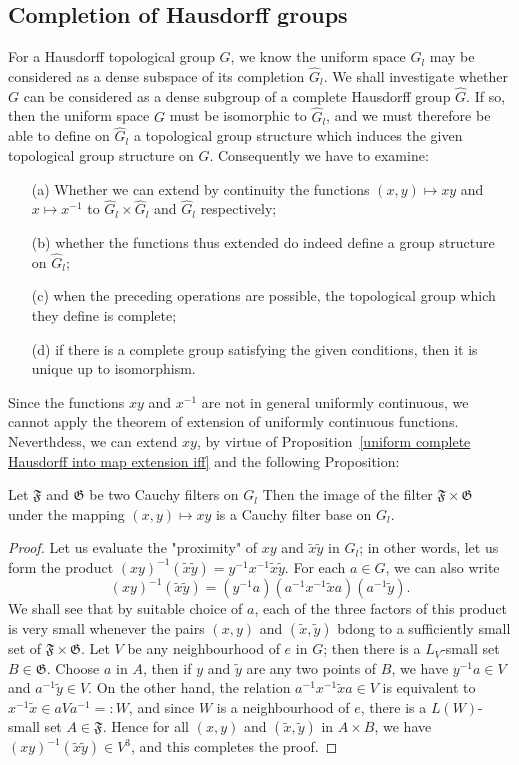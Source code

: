 \subsection{Completion of Hausdorff groups}
For a Hausdorff topological group $G$, we know the uniform space $G_l$ may be considered as a dense subspace of its completion $\widehat{G}_l$. We shall investigate whether $G$ can be considered as a dense subgroup of a complete Hausdorff group $\widehat{G}$. If so, then the uniform space $G$ must be isomorphic to $\widehat{G}_l$, and we must therefore be able to define on $\widehat{G}_l$ a topological group structure which induces the given topological group structure on $G$. Consequently we have to examine:
\begin{itemize}
\item[(a)] Whether we can extend by continuity the functions $(x,y)\mapsto xy$ and $x\mapsto x^{-1}$ to $\widehat{G}_l\times\widehat{G}_l$ and $\widehat{G}_l$ respectively;
\item[(b)] whether the functions thus extended do indeed define a group structure on $\widehat{G}_l$;
\item[(c)] when the preceding operations are possible, the topological group which they define is complete;
\item[(d)] if there is a complete group satisfying the given conditions, then it is unique up to isomorphism.
\end{itemize}
Since the functions $xy$ and $x^{-1}$ are not in general uniformly continuous, we cannot apply the theorem of extension of uniformly continuous functions. Neverthdess, we can extend $xy$, by virtue of Proposition~\ref{uniform complete Hausdorff into map extension iff} and the following Proposition:
\begin{proposition}\label{topological group Cauchy filter under multiplication}
Let $\mathfrak{F}$ and $\mathfrak{G}$ be two Cauchy filters on $G_l$ Then the image of the filter $\mathfrak{F}\times\mathfrak{G}$ under the mapping $(x,y)\mapsto xy$ is a Cauchy filter base on $G_l$.
\end{proposition}
\begin{proof}
Let us evaluate the "proximity" of $xy$ and $\tilde{x}\tilde{y}$ in $G_l$; in other words, let us form the product $(xy)^{-1}(\tilde{x}\tilde{y})=y^{-1}x^{-1}\tilde{x}\tilde{y}$. For each $a\in G$, we can also write
\[(xy)^{-1}(\tilde{x}\tilde{y})=(y^{-1}a)(a^{-1}x^{-1}\tilde{x}a)(a^{-1}\tilde{y}).\]
We shall see that by suitable choice of $a$, each of the three factors of this product is very small whenever the pairs $(x,y)$ and $(\tilde{x},\tilde{y})$ bdong to a sufficiently small set of $\mathfrak{F}\times\mathfrak{G}$. Let $V$ be any neighbourhood of $e$ in $G$; then there is a $L_V$-small set $B\in\mathfrak{G}$. Choose $a$ in $A$, then if $y$ and $\tilde{y}$ are any two points of $B$, we have $y^{-1}a\in V$ and $a^{-1}\tilde{y}\in V$. On the other hand, the relation $a^{-1}x^{-1}\tilde{x}a\in V$ is equivalent to $x^{-1}\tilde{x}\in aVa^{-1}=:W$, and since $W$ is a neighbourhood of $e$, there is a $L(W)$-small set $A\in\mathfrak{F}$. Hence for all $(x,y)$ and $(\tilde{x},\tilde{y})$ in $A\times B$, we have $(xy)^{-1}(\tilde{x}\tilde{y})\in V^3$, and this completes the proof.
\end{proof}
